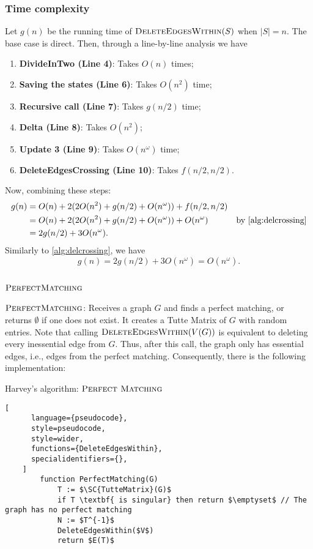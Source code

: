 \subsubsection{Time complexity}
\noindent
Let \(g(n)\) be the running time of \(\textsc{DeleteEdgesWithin}(S)\) when \(|S| = n\).
The base case is direct.
Then, through a line-by-line analysis we have
\begin{enumerate}
  \item \textbf{DivideInTwo (Line 4)}: Takes \(O(n)\) times;
  \item \textbf{Saving the states (Line 6)}: Takes \(O(n^2)\) time;
  \item \textbf{Recursive call (Line 7)}: Takes \(g(n/2)\) time;
  \item \textbf{Delta (Line 8)}: Takes \(O(n^2)\);
  \item \textbf{Update 3 (Line 9)}: Takes \(O(n^\omega)\) time;
  \item \textbf{DeleteEdgesCrossing (Line 10)}: Takes \(f(n/2, n/2)\).
\end{enumerate}
Now, combining these steps:
\begin{align*}
    g(n) &= O(n) + 2 (2O(n^2) + g(n / 2) + O(n^\omega)) + f(n/2, n/2) &  \\
    &= O(n) + 2 (2O(n^2) + g(n / 2) + O(n^\omega)) + O(n^\omega) & \text{by \eqref{alg:delcrossing}} \\
    &= 2g(n / 2) + 3O(n^\omega).
\end{align*}
Similarly to \cref{alg:delcrossing}, we have
\begin{equation}
\label{alg:delwithin}
  g(n) = 2g(n / 2) + 3O(n^\omega) = O(n^\omega).
\end{equation}

\subsection{\(\SC{PerfectMatching}\)}

\(\SC{PerfectMatching}\): Receives a graph \(G\) and finds a perfect matching, or returns \(\emptyset\) if one does not exist.
It creates a Tutte Matrix of \(G\) with random entries.
Note that calling \(\textsc{DeleteEdgesWithin}(V(G))\) is equivalent to deleting every inessential edge from \(G\).
Thus, after this call, the graph only has essential edges, i.e., edges from the perfect matching. 
Consequently, there is the following implementation:

\begin{programruledcaption}{Harvey's algorithm: \(\SC{Perfect Matching}\)}
    \begin{lstlisting}[
      language={pseudocode},
      style=pseudocode,
      style=wider,
      functions={DeleteEdgesWithin},
      specialidentifiers={},
    ]
        function PerfectMatching(G)
            T := $\SC{TutteMatrix}(G)$
            if T \textbf{ is singular} then return $\emptyset$ // The graph has no perfect matching
            N := $T^{-1}$
            DeleteEdgesWithin($V$)
            return $E(T)$
    \end{lstlisting}
\end{programruledcaption}

